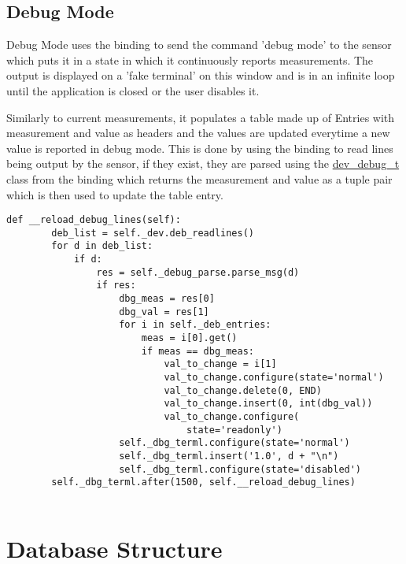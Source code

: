 \documentclass[a4paper,12pt, notitlepage]{article}
\begin{document}
\subsection{Debug Mode}

Debug Mode uses the binding to send the command 'debug mode' to the sensor which puts it in a state in which it continuously reports measurements. The output is displayed on a 'fake terminal' on this window and is in an infinite loop until the application is closed or the user disables it.

Similarly to current measurements, it populates a table made up of Entries with measurement and value as headers and the values are updated everytime a new value is reported in debug mode. This is done by using the binding to read lines being output by the sensor, if they exist, they are parsed using the \url{dev_debug_t} class from the binding which returns the measurement and value as a tuple pair which is then used to update the table entry.

\begin{lstlisting}[caption={Functions related to debug mode},label={lst: exampdebnug}]
    def __reload_debug_lines(self):
        deb_list = self._dev.deb_readlines()
        for d in deb_list:
            if d:
                res = self._debug_parse.parse_msg(d)
                if res:
                    dbg_meas = res[0]
                    dbg_val = res[1]
                    for i in self._deb_entries:
                        meas = i[0].get()
                        if meas == dbg_meas:
                            val_to_change = i[1]
                            val_to_change.configure(state='normal')
                            val_to_change.delete(0, END)
                            val_to_change.insert(0, int(dbg_val))
                            val_to_change.configure(
                                state='readonly')
                    self._dbg_terml.configure(state='normal')
                    self._dbg_terml.insert('1.0', d + "\n")
                    self._dbg_terml.configure(state='disabled')
        self._dbg_terml.after(1500, self.__reload_debug_lines)
       
\end{lstlisting}


\newpage
\section{Database Structure}
\label{sec: dbstructgui}
\end{document}

